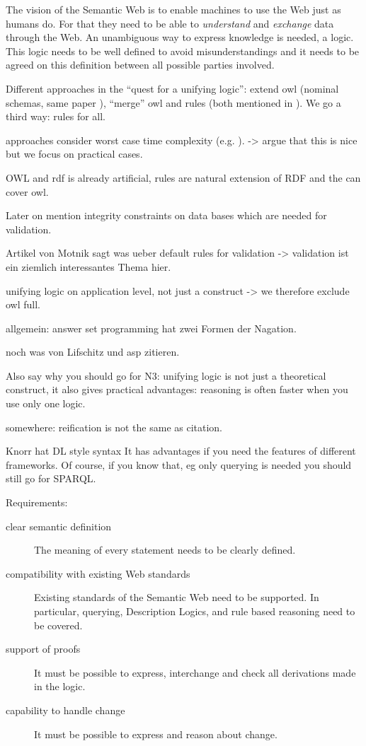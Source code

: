 The vision of the Semantic Web is to enable machines to use the Web just as humans do. For that they need to be able to \emph{understand} and \emph{exchange} data through the Web. 
An unambiguous way to express knowledge is needed, a logic. 
This logic needs to be well defined to avoid misunderstandings and it needs to be agreed on this definition between all possible parties involved.


Different approaches in the ``quest for a unifying logic'': extend owl (nominal schemas, same paper \cite{unilogic}), ``merge'' owl and rules (both mentioned in \cite{unilogic}). We go a third way: rules for all.

approaches consider worst case time complexity (e.g. \cite{unilogic}). -> argue that this is nice but we focus on practical cases.

OWL and rdf is already artificial, rules are natural extension of RDF and the can cover owl.

Later on mention integrity constraints on data bases which are needed for validation.

Artikel von Motnik \cite{DLASP} sagt was ueber default rules for validation -> validation ist ein ziemlich interessantes Thema hier.

unifying logic on application level, not just a construct -> we therefore exclude owl full.

allgemein: answer set programming hat zwei Formen der Nagation.

noch was von Lifschitz und asp zitieren.


Also say why you should go for N3: unifying logic is not just a theoretical construct, it also gives practical advantages: reasoning is often faster when you use only one logic.  

somewhere: reification is not the same as citation.

Knorr hat DL style syntax
It has advantages if you need 
the features of different frameworks. Of course, if you know that, eg only querying is needed you should still go for SPARQL.


Requirements:
\begin{description}
 \item[clear semantic definition] 
The meaning of every statement needs to be clearly defined.
 \item[compatibility with existing Web standards]  Existing standards of the Semantic Web need to be supported. 
 In particular, querying, Description Logics, and rule based reasoning need to be covered.
 \item[support of proofs] It must be possible to express, interchange and check all derivations made in the logic.
 \item[capability to handle change] It must be possible to express and reason about change.
\end{description}
